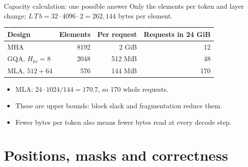 \documentclass[handout]{beamer}
\begin{document}
\begin{frame}{Capacity calculation: one possible answer}
  Only the elements per token and layer change; $L\,T\,b=32\cdot4096\cdot2=262{,}144$ bytes per element.
  \par\vspace{6pt}
  \begin{center}
    \begin{tabular}{@{}lrrr@{}}
      \toprule
      Design & Elements & Per request & Requests in 24 GiB \\
      \midrule
      MHA & 8192 & 2 GiB & 12 \\
      GQA, $H_{kv}=8$ & 2048 & 512 MiB & 48 \\
      MLA, $512+64$ & 576 & 144 MiB & 170 \\
      \bottomrule
    \end{tabular}
  \end{center}
  \begin{itemize}
      \setlength{\itemsep}{6pt}
    \item MLA: $24\cdot1024/144=170.7$, so 170 whole requests.
    \item These are upper bounds: block slack and fragmentation reduce them.
    \item Fewer bytes per token also means fewer bytes read at every decode step.
  \end{itemize}
\end{frame}

\section{Positions, masks and correctness}
\end{document}
